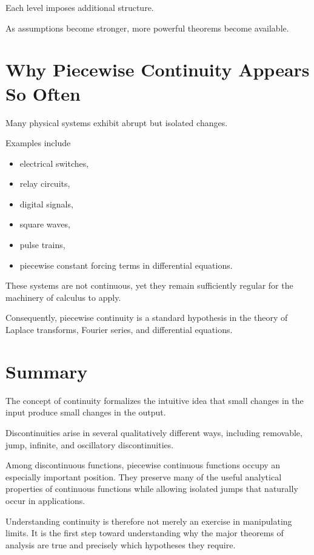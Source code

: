 \documentclass{essay}
\begin{document}
Each level imposes additional structure.

As assumptions become stronger, more powerful theorems become available.


\section{Why Piecewise Continuity Appears So Often}

Many physical systems exhibit abrupt but isolated changes.

Examples include

\begin{itemize}
\item electrical switches,
\item relay circuits,
\item digital signals,
\item square waves,
\item pulse trains,
\item piecewise constant forcing terms in differential equations.
\end{itemize}

These systems are not continuous, yet they remain sufficiently regular for the
machinery of calculus to apply.

Consequently, piecewise continuity is a standard hypothesis in the theory of
Laplace transforms, Fourier series, and differential equations.


\section{Summary}

The concept of continuity formalizes the intuitive idea that small changes in
the input produce small changes in the output.

Discontinuities arise in several qualitatively different ways, including
removable, jump, infinite, and oscillatory discontinuities.

Among discontinuous functions, piecewise continuous functions occupy an
especially important position. They preserve many of the useful analytical
properties of continuous functions while allowing isolated jumps that naturally
occur in applications.

Understanding continuity is therefore not merely an exercise in manipulating
limits. It is the first step toward understanding why the major theorems of
analysis are true and precisely which hypotheses they require.
\end{document}

